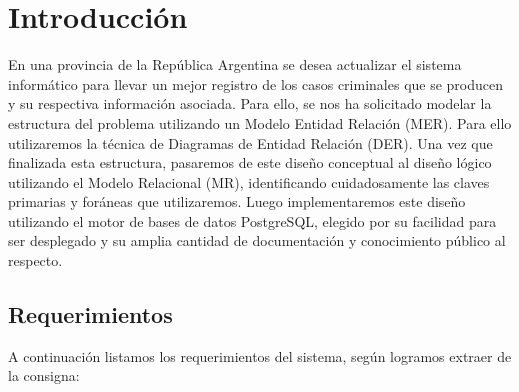 \documentclass{article}
\theoremstyle{definition}
\theoremstyle{remark}
\begin{document}
{} %

\grupo{}

 
\maketitle

\tableofcontents

\pagebreak

\section{Introducción}

En una provincia de la República Argentina se desea actualizar el sistema informático para llevar un mejor registro de los casos criminales que se producen y su respectiva información asociada. Para ello, se nos ha solicitado modelar la estructura del problema utilizando un Modelo Entidad Relación (MER). Para ello utilizaremos la técnica de Diagramas de Entidad Relación (DER). Una vez que finalizada esta estructura, pasaremos de este diseño conceptual al diseño lógico utilizando el Modelo Relacional (MR), identificando cuidadosamente las claves primarias y foráneas que utilizaremos. Luego implementaremos este diseño utilizando el motor de bases de datos PostgreSQL, elegido por su facilidad para ser desplegado y su amplia cantidad de documentación y conocimiento público al respecto.

\subsection{Requerimientos}

A continuación listamos los requerimientos del sistema, según logramos extraer de la consigna:
\end{document}

